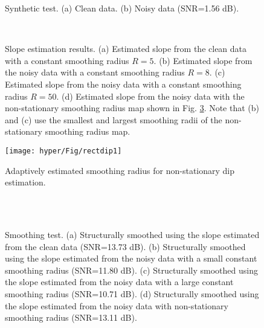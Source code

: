 \begin{figure}[htb!]
\centering
{}
\caption{Synthetic test. (a) Clean data. (b) Noisy data (SNR=1.56 dB). }
\label{fig:hyper,hyper-n}
\end{figure}

\begin{figure}[htb!]
\centering
{}
  \\
\caption{Slope estimation results. (a) Estimated slope from the clean data with a constant smoothing radius $R=5$. (b) Estimated slope from the noisy data with a constant smoothing radius $R=8$. (c) Estimated slope from the noisy data with a constant smoothing radius $R=50$. (d) Estimated slope from the noisy data with the non-stationary smoothing radius map shown in Fig. \ref{fig:rectdip1}. Note that (b) and (c) use the smallest and largest smoothing radii of the non-stationary smoothing radius map. }
\label{fig:hyper-dip,hypern-dip,hypern-dip2,hypern-dip3}
\end{figure}

\begin{figure}[htb!]
 \centering
 \texttt{[image: hyper/Fig/rectdip1]}
  \caption{Adaptively estimated smoothing radius for non-stationary dip estimation.}
  \label{fig:rectdip1}
\end{figure}

\begin{figure}[htb!]
\centering
{}
   \\
   \\
\caption{Smoothing test. (a) Structurally smoothed using the slope estimated from the clean data (SNR=13.73 dB). (b) Structurally smoothed using the slope estimated from the noisy data with a small constant smoothing radius (SNR=11.80 dB). (c) Structurally smoothed using the slope estimated from the noisy data with a large constant smoothing radius (SNR=10.71 dB). (d) Structurally smoothed using the slope estimated from the noisy data with non-stationary smoothing radius (SNR=13.11 dB).}
\label{fig:hypern-sm1,hypern-sm2,hypern-sm3,hypern-sm4}
\end{figure}

